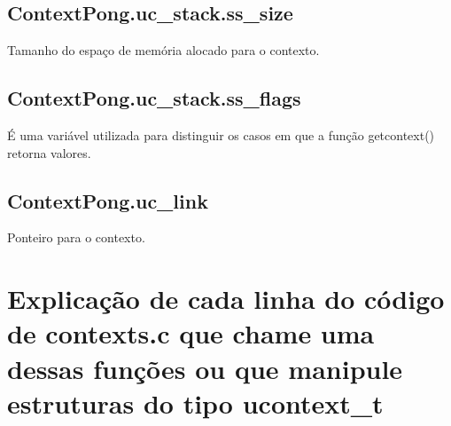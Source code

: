 \documentclass[12pt]{article}
\begin{document}
\subsection{ContextPong.uc\_stack.ss\_size}
Tamanho do espaço de memória alocado para o contexto.


\subsection{ContextPong.uc\_stack.ss\_flags}
É uma variável utilizada para distinguir os casos em que a função getcontext() retorna valores.


\subsection{ContextPong.uc\_link}
Ponteiro para o contexto.


\section{Explicação de cada linha do código de contexts.c que chame uma dessas funções ou que manipule estruturas do tipo ucontext\_t}
\end{document}
